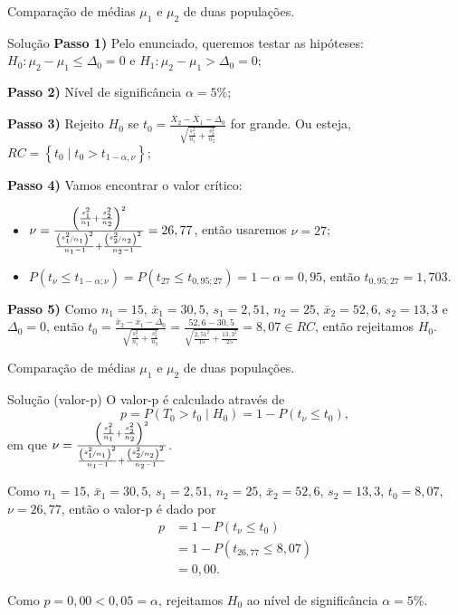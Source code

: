 \documentclass[9pt]{beamer}
\begin{document}
\begin{frame}{Comparação de médias $\mu_1$ e $\mu_2$ de duas populações.}

\begin{block}{Solução}
	\textbf{Passo 1)} Pelo enunciado, queremos testar as hipóteses: $H_0: \mu_2 - \mu_1 \leq \Delta_0 = 0$ e $H_1: \mu_2 - \mu_1 > \Delta_0 = 0$;
	
	\textbf{Passo 2)} Nível de significância $\alpha=5\%$;
	
	\textbf{Passo 3)} Rejeito $H_0$ se $t_0 = \frac{\bar{X}_2 - \bar{X}_1 -\Delta_0}{\sqrt{\frac{s_1^2}{n_1} + \frac{s_2^2}{n_2}}}$ for grande. Ou esteja, $RC = \left\{ t_0 \mid t_0 > t_{1-\alpha, \nu} \right\}$;
	
	\textbf{Passo 4)} Vamos encontrar o valor crítico:
	\begin{itemize}
		\item $\nu = \frac{\left( \frac{s_1^2}{n_1} + \frac{s_2^2}{n_2} \right)^2}{\frac{\left(\nicefrac{s_1^2}{n_1}\right)^2}{n_1-1} + \frac{\left(\nicefrac{s_2^2}{n_2}\right)^2}{n_2-1}} = 26,77$, então usaremos $\nu=27$;
		\item $P(t_\nu \leq t_{1-\alpha;\nu}) = P(t_{27} \leq t_{0,95; 27})= 1-\alpha = 0,95$, então $t_{0,95; 27} = 1,703$.
	\end{itemize}

	\textbf{Passo 5)} Como $n_1=15$, $\bar{x}_1=30,5$, $s_1 = 2,51$, $n_2=25$, $\bar{x}_2 = 52,6$, $s_2 = 13,3$ e $\Delta_0=0$, então $t_0 = \frac{\bar{x}_2 - \bar{x}_1 - \Delta_0}{\sqrt{\frac{s_1^2}{n_1} + \frac{s_2^2}{n_2}}}= \frac{52,6 - 30,5}{\sqrt{\frac{2,51^2}{15} + \frac{13,3^2}{25}}} = 8,07 \in RC$, então rejeitamos $H_0$.
\end{block}
\end{frame}

\begin{frame}{Comparação de médias $\mu_1$ e $\mu_2$ de duas populações.}

\begin{block}{Solução (valor-p)}
	O valor-p é calculado através de
	$$p=P(T_0 > t_0 \mid H_0) = 1 - P(t_\nu \leq t_0),$$
	em que $\nu = \frac{\left( \frac{s_1^2}{n_1} + \frac{s_2^2}{n_2} \right)^2}{\frac{\left(\nicefrac{s_1^2}{n_1}\right)^2}{n_1-1} + \frac{\left(\nicefrac{s_2^2}{n_2}\right)^2}{n_2-1}}$.
	
	Como $n_1 = 15$, $\bar{x}_1 = 30,5$, $s_1=2,51$, $n_2 = 25$, $\bar{x}_2 = 52,6$, $s_2 = 13,3$, $t_0 = 8,07$, $\nu = 26,77$, então o valor-p é dado por
	\begin{align*}
		p &= 1 - P(t_\nu \leq t_0)\\
		&= 1 - P(t_{26,77} \leq 8,07)\\
		&= 0,00.
	\end{align*}
	
	Como $p=0,00 < 0,05 = \alpha$, rejeitamos $H_0$ ao nível de significância $\alpha=5\%$.
\end{block}
\end{frame}
\end{document}
